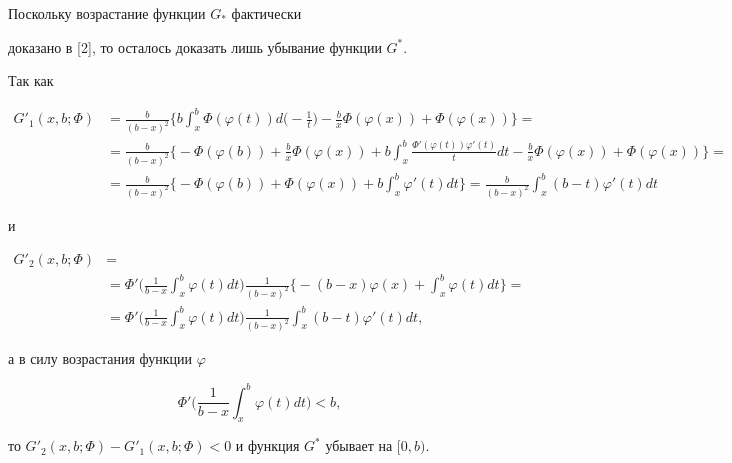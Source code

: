 \begin{pf} Поскольку возрастание функции $G_*$ фактически


доказано в [2], то осталось доказать лишь убывание функции $G^*$.


Так как


\begin{align*}


G'_1(x,b;\Phi)&=\frac{b}{(b-x)^2}


\bigg\{b\int_x^b \Phi(\varphi(t))d\bigg(-\frac 1t\bigg)-\frac bx


\Phi(\varphi(x))+\Phi(\varphi(x))\bigg\}=\\


&=\frac{b}{(b-x)^2}\bigg\{-\Phi(\varphi(b))+\frac bx \Phi(\varphi(x))


+ b\int_x^b \frac{\Phi'(\varphi(t))\varphi'(t)}{t}dt


-\frac bx \Phi(\varphi(x))+\Phi(\varphi(x))\bigg\}=\\


&=\frac{b}{(b-x)^2}\bigg\{-\Phi(\varphi(b))+ \Phi(\varphi(x))


+ b\int_x^b \varphi'(t)dt\bigg\}=


\frac{b}{(b-x)^2}\int_x^b (b-t)\varphi'(t)dt


\end{align*}


и


\begin{align*}


G'_2(x,b;\Phi)&=\\


&=\Phi'\bigg(\frac{1}{b-x}\int_x^b \varphi(t)dt\bigg)


\frac{1}{(b-x)^2}\bigg\{-(b-x)\varphi(x)+\int_x^b \varphi(t)dt\bigg\}=\\


&=\Phi'\bigg(\frac{1}{b-x}\int_x^b \varphi(t)dt\bigg)


\frac{1}{(b-x)^2}\int_x^b (b-t)\varphi'(t)dt,


\end{align*}


а в силу возрастания функции $\varphi$


$$


\Phi'\bigg(\frac{1}{b-x}\int_x^b \varphi(t)dt\bigg)<b,


$$


то $G'_2(x,b;\Phi)-G'_1(x,b;\Phi)<0$ и функция $G^*$ убывает на $[0,b)$. 


\end{pf}





